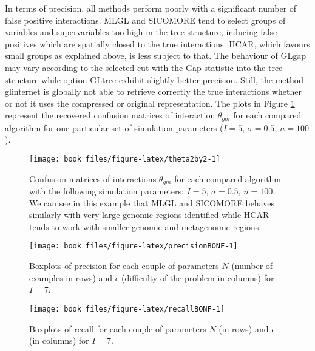 \documentclass[]{book}
\begin{document}
In terms of precision, all methods perform poorly with a significant
number of false positive interactions. MLGL and SICOMORE tend to select
groups of variables and supervariables too high in the tree structure,
inducing false positives which are spatially closed to the true
interactions. HCAR, which favours small groups as explained above, is
less subject to that. The behaviour of GLgap may vary according to the
selected cut with the Gap statistic into the tree structure while option
GLtree exhibit slightly better precision. Still, the method glinternet
is globally not able to retrieve correctly the true interactions whether
or not it uses the compressed or original representation. The plots in
Figure \ref{fig:theta2by2} represent the recovered confusion matrices of
interaction \(\theta_{gm}\) for each compared algorithm for one particular
set of simulation parameters (\(I = 5\), \(\sigma = 0.5\), \(n=100\)).



\begin{figure}

{\centering \texttt{[image: book\_files/figure-latex/theta2by2-1]} 

}

\caption{Confusion matrices of interactions \(\theta_{gm}\) for each compared algorithm with the following simulation parameters: \(I = 5\), \(\sigma = 0.5\), \(n=100\). We can see in this example that MLGL and SICOMORE behaves similarly with very large genomic regions identified while HCAR tends to work with smaller genomic and metagenomic regions.}\label{fig:theta2by2}
\end{figure}



\begin{figure}

{\centering \texttt{[image: book\_files/figure-latex/precisionBONF-1]} 

}

\caption{Boxplots of precision for each couple of parameters \(N\) (number of examples in rows) and \(\epsilon\) (difficulty of the problem in columns) for \(I=7\).}\label{fig:precisionBONF}
\end{figure}



\begin{figure}

{\centering \texttt{[image: book\_files/figure-latex/recallBONF-1]} 

}

\caption{Boxplots of recall for each couple of parameters \(N\) (in rows) and \(\epsilon\) (in columns) for \(I=7\).}\label{fig:recallBONF}
\end{figure}
\end{document}
